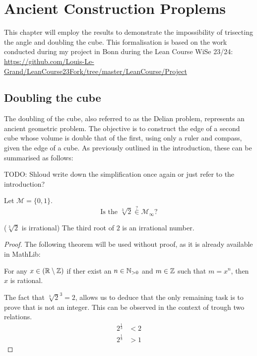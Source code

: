 \chapter{Ancient Construction Proplems}
This chapter will employ the results to demonstrate the impossibility of trisecting the angle and doubling the cube. 
This formalisation is based on the work conducted during my project in Bonn during the Lean Course WiSe 23/24: 
\url{https://github.com/Louis-Le-Grand/LeanCourse23Fork/tree/master/LeanCourse/Project}

\section{Doubling the cube}
The doubling of the cube, also referred to as the Delian problem, represents an ancient geometric problem.
The objective is to construct the edge of a second cube whose volume is double that of the first, using only a ruler and compass, given the edge of a cube.
As previously outlined in the introduction, these can be summarised as follows: 

TODO: Shloud write down the simplification once again or just refer to the introduction?
\begin{problem}
    Let $\mathcal{M} = \{0,1\}$.  
    $$\text{Is the }\sqrt[3]{2} \overset{?}{\in} \mathcal{M}_{\infty}?$$
\end{problem}

\begin{lemma}($\sqrt[3]{2}$ is irrational)
    \label{lem:irrational_thirdroot_two}
    \leanok
    The third root of $2$ is an irrational number.
\end{lemma}
\begin{proof}
    The following theorem will be used without proof, as it is already available in MathLib:
    \begin{theorem*}
        For any $x\in(\mathbb{R}\setminus\mathbb{Z})$ if ther exist an $n\in \mathbb{N}_{>0}$ and $m\in\mathbb{Z}$ such that $m = x^n$, then $x$ is rational. 
    \end{theorem*}
    The fact that $\sqrt[3]{2}^3=2$, allows us to deduce that the only remaining task is to prove that is not an integer. 
    This can be observed in the context of trough two relations.
    \begin{align}
        2^{\frac{1}{3}} &< 2 \\
        2^{\frac{1}{3}} &> 1
    \end{align}
\end{proof}

